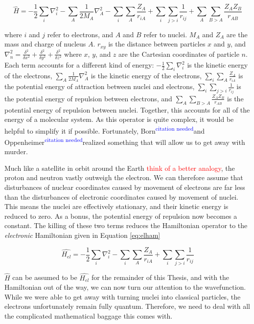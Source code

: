 \documentclass[12pt]{report}
\newcommand{\notetodylan}[1]{\textcolor{red}{#1}} %
\newcommand{\citethis}{\textsuperscript{\textcolor{blue}{citation needed}}} %
\begin{document}
\begin{equation}
\label{eq:ham}
\hat{H} = -\frac{1}{2}\sum_{i}\nabla^{2}_{i} - \sum_{A}\frac{1}{2M_{A}}\nabla^{2}_{A} - \sum_{i}\sum_{A}\frac{Z_{A}}{r_{iA}}
+ \sum_{i}\sum_{j>i}\frac{1}{r_{ij}} + \sum_{A}\sum_{B>A}\frac{Z_{A}Z_{B}}{r_{AB}}
\end{equation} 

where $i$ and $j$ refer to electrons, and $A$ and $B$ refer to nuclei. $M_{A}$ and $Z_{A}$ are the mass and charge of nucleus $A$. $r_{xy}$ is the distance between particles $x$ and $y$, and $\nabla^{2}_{n}=\frac{\delta^{2}}{\delta x^{2}}+\frac{\delta^{2}}{\delta y^{2}}+\frac{\delta^{2}}{\delta z^{2}}$ where $x$, $y$, and $z$ are the Cartesian coordinates of particle $n$. Each term accounts for a different kind of energy: $-\frac{1}{2}\sum_{i}\nabla^{2}_{i}$ is the kinetic energy of the electrons, $\sum_{A}\frac{1}{2M_{A}}\nabla^{2}_{A}$ is the kinetic energy of the electrons, $\sum_{i}\sum_{A}\frac{Z_{A}}{r_{iA}}$ is the potential energy of attraction between nuclei and electrons, $\sum_{i}\sum_{j>i}\frac{1}{r_{ij}}$ is the potential energy of repulsion between electrons, and $\sum_{A}\sum_{B>A}\frac{Z_{A}Z_{B}}{r_{AB}}$ is the potential energy of repulsion between nuclei. Together, this accounts for all of the energy of a molecular system. As this operator is quite complex, it would be helpful to simplify it if possible. Fortunately, Born\citethis and Oppenheimer\citethis realized something that will allow us to get away with murder.

Much like a satellite in orbit around the Earth \notetodylan{think of a better analogy}, the proton and neutron vastly outweigh the electron. We can therefore assume that disturbances of nuclear coordinates caused by movement of electrons are far less than the disturbances of electronic coordinates caused by movement of nuclei. This means the nuclei are effectively stationary, and their kinetic energy is reduced to zero. As a bonus, the potential energy of repulsion now becomes a constant. The killing of these two terms reduces the Hamiltonian operator to the \textit{electronic} Hamiltonian given in Equation \ref{eq:elham}

\begin{equation}
\label{eq:elham}
\hat{H_{el}} = -\frac{1}{2}\sum_{i}\nabla^{2}_{i}  - \sum_{i}\sum_{A}\frac{Z_{A}}{r_{iA}} + \sum_{i}\sum_{j>i}\frac{1}{r_{ij}}
\end{equation} 

$\hat{H}$ can be assumed to be $\hat{H_{el}}$ for the remainder of this Thesis, and with the Hamiltonian out of the way, we can now turn our attention to the wavefunction. While we were able to get away with turning nuclei into classical particles, the electrons unfortunately remain fully quantum. Therefore, we need to deal with all the complicated mathematical baggage this comes with.
\end{document}
